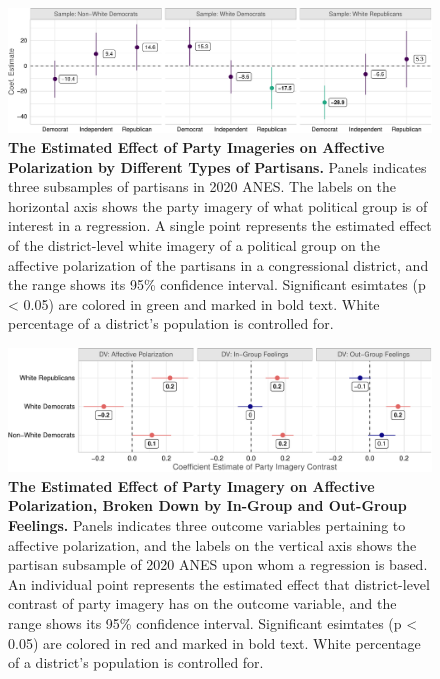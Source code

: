 \documentclass[
  12pt,
]{article}
\begin{document}
\begin{figure}[tb]

{\centering \includegraphics{local-images_files/figure-pdf/fig-baseline-1.pdf}

}

\caption{\label{fig-baseline}\textbf{The Estimated Effect of Party
Imageries on Affective Polarization by Different Types of Partisans.}
Panels indicates three subsamples of partisans in 2020 ANES. The labels
on the horizontal axis shows the party imagery of what political group
is of interest in a regression. A single point represents the estimated
effect of the district-level white imagery of a political group on the
affective polarization of the partisans in a congressional district, and
the range shows its 95\% confidence interval. Significant esimtates (p
\textless{} 0.05) are colored in green and marked in bold text. White
percentage of a district's population is controlled for.}

\end{figure}

\begin{figure}[tb]

{\centering \includegraphics{local-images_files/figure-pdf/fig-decompose-1.pdf}

}

\caption{\label{fig-decompose}\textbf{The Estimated Effect of Party
Imagery on Affective Polarization, Broken Down by In-Group and Out-Group
Feelings.} Panels indicates three outcome variables pertaining to
affective polarization, and the labels on the vertical axis shows the
partisan subsample of 2020 ANES upon whom a regression is based. An
individual point represents the estimated effect that district-level
contrast of party imagery has on the outcome variable, and the range
shows its 95\% confidence interval. Significant esimtates (p \textless{}
0.05) are colored in red and marked in bold text. White percentage of a
district's population is controlled for.}

\end{figure}
\end{document}
